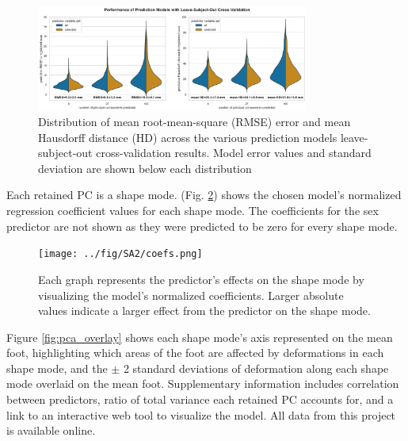 \documentclass[defaultstyle,11pt]{thesis}
\begin{document}
\hypertarget{fig:modelperf}{%
\begin{figure}
\centering
\includegraphics[width=0.8\textwidth,height=\textheight]{../fig/SA2/modelPerformance.png}
\caption[{Distribution of mean root-mean-square (RMSE) error and mean Hausdorff distance (HD) across the various prediction models}]{Distribution of mean root-mean-square (RMSE) error and mean Hausdorff distance (HD) across the various prediction models leave-subject-out cross-validation results. Model error values and standard deviation are shown below each distribution}
\label{fig:modelperf}
\end{figure}
}

Each retained PC is a shape mode.
(Fig. \ref{fig:SA2-coefs}) shows the chosen model's normalized regression coefficient values for each shape mode.
The coefficients for the sex predictor are not shown as they were predicted to be zero for every shape mode.

\hypertarget{fig:SA2-coefs}{%
\begin{figure}
\centering
\texttt{[image: ../fig/SA2/coefs.png]}
\caption[{Foot shape model's normalized coefficients}]{Each graph represents the predictor's effects on the shape mode by visualizing the model's normalized coefficients. Larger absolute values indicate a larger effect from the predictor on the shape mode.}
\label{fig:SA2-coefs}
\end{figure}
}

Figure \ref{fig:pca_overlay} shows each shape mode's axis represented on the mean foot, highlighting which areas of the foot are affected by deformations in each shape mode, and the \(\pm\) 2 standard deviations of deformation along each shape mode overlaid on the mean foot.
Supplementary information includes correlation between predictors, ratio of total variance each retained PC accounts for, and a link to an interactive web tool to visualize the model.
All data from this project is available online.
\end{document}
